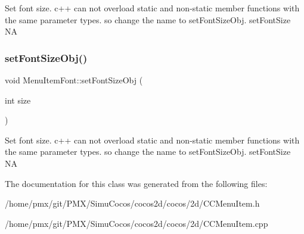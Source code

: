 Set font size. c++ can not overload static and non-\/static member functions with the same parameter types. so change the name to set\+Font\+Size\+Obj.  set\+Font\+Size  NA \mbox{\label{classMenuItemFont_aef699c4a066777868fa36c547cb4e62a}} 
\subsubsection{\texorpdfstring{set\+Font\+Size\+Obj()}{setFontSizeObj()}\hspace{0.1cm}{\footnotesize\ttfamily [2/2]}}
{\footnotesize\ttfamily void Menu\+Item\+Font\+::set\+Font\+Size\+Obj (\begin{DoxyParamCaption}\item[{int}]{size }\end{DoxyParamCaption})}

Set font size. c++ can not overload static and non-\/static member functions with the same parameter types. so change the name to set\+Font\+Size\+Obj.  set\+Font\+Size  NA 

The documentation for this class was generated from the following files\+:\begin{DoxyCompactItemize}
\item 
/home/pmx/git/\+P\+M\+X/\+Simu\+Cocos/cocos2d/cocos/2d/C\+C\+Menu\+Item.\+h\item 
/home/pmx/git/\+P\+M\+X/\+Simu\+Cocos/cocos2d/cocos/2d/C\+C\+Menu\+Item.\+cpp\end{DoxyCompactItemize}
